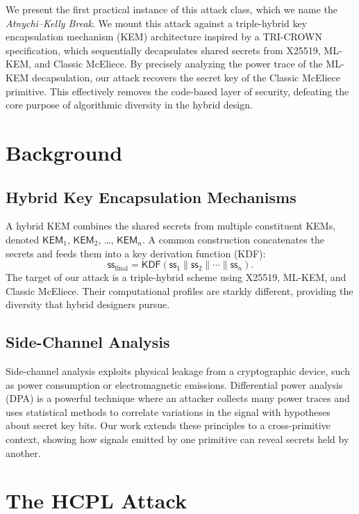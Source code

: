 \documentclass[runningheads]{llncs}
\begin{document}
We present the first practical instance of this attack class, which we name the \emph{Atnychi--Kelly Break}. We mount this attack against a triple-hybrid key encapsulation mechanism (KEM) architecture inspired by a TRI-CROWN specification, which sequentially decapsulates shared secrets from X25519, ML-KEM, and Classic McEliece. By precisely analyzing the power trace of the ML-KEM decapsulation, our attack recovers the secret key of the Classic McEliece primitive. This effectively removes the code-based layer of security, defeating the core purpose of algorithmic diversity in the hybrid design.

\section{Background}
\subsection{Hybrid Key Encapsulation Mechanisms}
A hybrid KEM combines the shared secrets from multiple constituent KEMs, denoted $\mathsf{KEM}_1$, $\mathsf{KEM}_2$, \ldots, $\mathsf{KEM}_n$. A common construction concatenates the secrets and feeds them into a key derivation function (KDF):
\begin{equation}
    \mathsf{ss}_{\mathrm{final}} = \mathsf{KDF}(\mathsf{ss}_1 \parallel \mathsf{ss}_2 \parallel \cdots \parallel \mathsf{ss}_n).
\end{equation}
The target of our attack is a triple-hybrid scheme using X25519, ML-KEM, and Classic McEliece. Their computational profiles are starkly different, providing the diversity that hybrid designers pursue.

\subsection{Side-Channel Analysis}
Side-channel analysis exploits physical leakage from a cryptographic device, such as power consumption or electromagnetic emissions. Differential power analysis (DPA) is a powerful technique where an attacker collects many power traces and uses statistical methods to correlate variations in the signal with hypotheses about secret key bits. Our work extends these principles to a cross-primitive context, showing how signals emitted by one primitive can reveal secrets held by another.

\section{The HCPL Attack}
\end{document}
